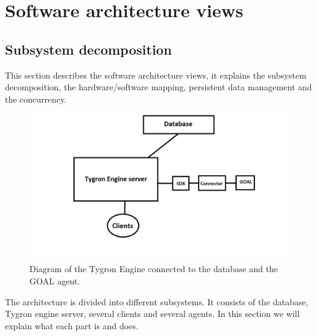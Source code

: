 \section{Software architecture views}

\subsection{Subsystem decomposition}
This section describes the software architecture views, it explains the subsystem decomposition, the hardware/software mapping, persistent data management and the concurrency.

\begin{figure}[h!]
  \centering
  \includegraphics[scale=0.55]{Tygrondatabase3.png}
  \caption{Diagram of the Tygron Engine connected to the database and the GOAL agent.}
  \label{fig:tygron1}
\end{figure}
The architecture is divided into different subsystems. It consists of the database, Tygron engine server, several clients and several agents. In this section we will explain what each part is and does.

